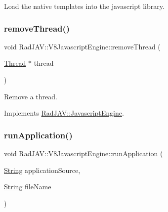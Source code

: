 Load the native templates into the javascript library. 

\mbox{\label{class_rad_j_a_v_1_1_v8_javascript_engine_a90a52c8c7d655d2e8e5e682d7618c2ab}} 
\subsubsection{\texorpdfstring{remove\+Thread()}{removeThread()}}
{\footnotesize\ttfamily void Rad\+J\+A\+V\+::\+V8\+Javascript\+Engine\+::remove\+Thread (\begin{DoxyParamCaption}\item[{\mbox{\hyperlink{class_rad_j_a_v_1_1_thread}{Thread}} $\ast$}]{thread }\end{DoxyParamCaption})\hspace{0.3cm}{\ttfamily [virtual]}}



Remove a thread. 



Implements \mbox{\hyperlink{class_rad_j_a_v_1_1_javascript_engine_afe08c6324e3958a5d3ec82fa9e0f1fd1}{Rad\+J\+A\+V\+::\+Javascript\+Engine}}.

\mbox{\label{class_rad_j_a_v_1_1_v8_javascript_engine_af792154ac1ceaa6c65faf2409cea5014}} 
\subsubsection{\texorpdfstring{run\+Application()}{runApplication()}}
{\footnotesize\ttfamily void Rad\+J\+A\+V\+::\+V8\+Javascript\+Engine\+::run\+Application (\begin{DoxyParamCaption}\item[{\mbox{\hyperlink{class_rad_j_a_v_1_1_string}{String}}}]{application\+Source,  }\item[{\mbox{\hyperlink{class_rad_j_a_v_1_1_string}{String}}}]{file\+Name }\end{DoxyParamCaption})\hspace{0.3cm}{\ttfamily [virtual]}}



